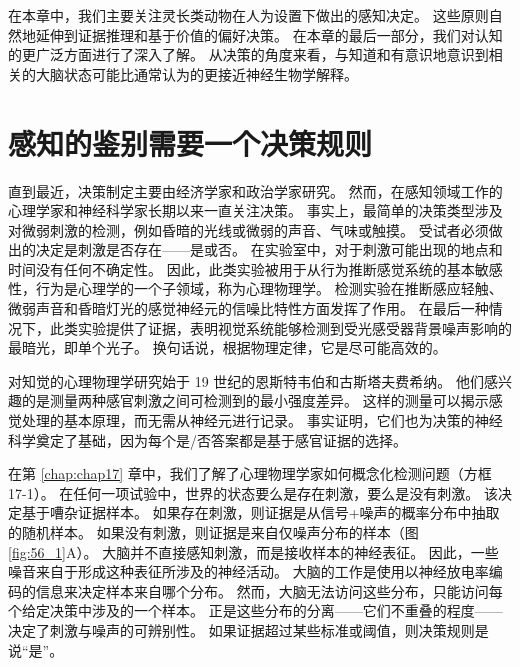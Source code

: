 在本章中，我们主要关注灵长类动物在人为设置下做出的感知决定。
这些原则自然地延伸到证据推理和基于价值的偏好决策。
在本章的最后一部分，我们对认知的更广泛方面进行了深入了解。
从决策的角度来看，与知道和有意识地意识到相关的大脑状态可能比通常认为的更接近神经生物学解释。



\section{感知的鉴别需要一个决策规则}

直到最近，决策制定主要由经济学家和政治学家研究。
然而，在感知领域工作的心理学家和神经科学家长期以来一直关注决策。
事实上，最简单的决策类型涉及对微弱刺激的检测，例如昏暗的光线或微弱的声音、气味或触摸。
受试者必须做出的决定是刺激是否存在——是或否。
在实验室中，对于刺激可能出现的地点和时间没有任何不确定性。
因此，此类实验被用于从行为推断感觉系统的基本敏感性，行为是心理学的一个子领域，称为心理物理学。
检测实验在推断感应轻触、微弱声音和昏暗灯光的感觉神经元的信噪比特性方面发挥了作用。
在最后一种情况下，此类实验提供了证据，表明视觉系统能够检测到受光感受器背景噪声影响的最暗光，即单个光子。
换句话说，根据物理定律，它是尽可能高效的。


对知觉的心理物理学研究始于 19 世纪的恩斯特韦伯和古斯塔夫费希纳。
他们感兴趣的是测量两种感官刺激之间可检测到的最小强度差异。
这样的测量可以揭示感觉处理的基本原理，而无需从神经元进行记录。
事实证明，它们也为决策的神经科学奠定了基础，因为每个是/否答案都是基于感官证据的选择。


在第 \ref{chap:chap17} 章中，我们了解了心理物理学家如何概念化检测问题（方框 17-1）。
在任何一项试验中，世界的状态要么是存在刺激，要么是没有刺激。
该决定基于嘈杂证据样本。
如果存在刺激，则证据是从信号+噪声的概率分布中抽取的随机样本。
如果没有刺激，则证据是来自仅噪声分布的样本（图 \ref{fig:56_1}A）。
大脑并不直接感知刺激，而是接收样本的神经表征。
因此，一些噪音来自于形成这种表征所涉及的神经活动。
大脑的工作是使用以神经放电率编码的信息来决定样本来自哪个分布。
然而，大脑无法访问这些分布，只能访问每个给定决策中涉及的一个样本。
正是这些分布的分离——它们不重叠的程度——决定了刺激与噪声的可辨别性。
如果证据超过某些标准或阈值，则决策规则是说“是”。


